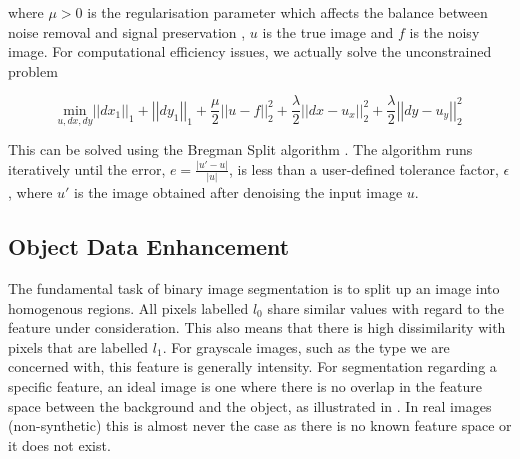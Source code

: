 \begin{definition}
	where $\mu > 0$ is the regularisation parameter which affects the balance between noise removal and signal preservation \citep{Getreuer2012}, $u$ is the true image and $f$ is the noisy image. For computational efficiency issues, we actually solve the unconstrained problem
	
	\begin{equation}
	\underset{u, dx, dy} {\mathrm{min}} \left| \left|dx_1 \right| \right|_1 + \left| \left| dy_1 \right| \right|_1 + \frac{\mu}{2} \left| \left| u-f \right| \right|^2_2 +
	\frac{\lambda}{2} \left| \left| dx-u_x \right| \right|^2_2 + \frac{\lambda}{2} \left| \left| dy-u_y \right| \right|^2_2
	\label{equ:anisotropic_tv_unconstrained}
	\end{equation}
	
	This can be solved using the Bregman Split algorithm \citep{Wei2010}.
	The algorithm runs iteratively until the error, $e = \frac{\vert u'-u \vert}{\vert u \vert}$,  is less than a user-defined tolerance factor, $\epsilon$, where $u'$ is the image obtained after denoising the input image $u$. 
\end{definition}

\subsection{Object Data Enhancement}
\label{sec:contrastcorrection}

The fundamental task of binary image segmentation is to split up an image into homogenous regions. All pixels labelled $l_0$ share similar values with regard to the feature under consideration. This also means that there is high dissimilarity with pixels that are labelled $l_1$. For grayscale images, such as the type we are concerned with, this feature is generally intensity.
For segmentation regarding a specific feature, an ideal image is one where there is no overlap in the feature space between the background and the object, as illustrated in . In real images (non-synthetic) this is almost never the case as there is no known feature space or it does not exist.

